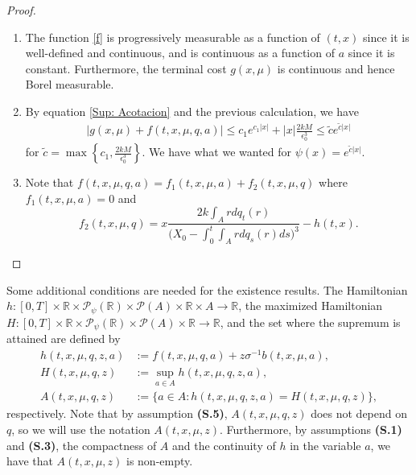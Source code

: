 \documentclass[11pt]{article}
\theoremstyle{definition}
\begin{document}
\begin{proof}
    \begin{enumerate}
        \item[\textbf{\hyperref[sup: S.3]{(S.3)}}]
        The function \eqref{f} is progressively measurable as a function of \( (t,x) \) since it is well-defined and continuous, and is continuous as a function of \( a \) since it is constant. Furthermore, the terminal cost \( g(x, \mu) \) is continuous and hence Borel measurable.
        \item[\textbf{\hyperref[sup: S.4]{(S.4)}}] By equation \eqref{Sup: Acotacion} and the previous calculation, we have
        \begin{align*}
            |g(x, \mu) + f(t,x,\mu,q,a)| \leq c_1 e^{c_1 |x|} + |x| \frac{2k M}{\epsilon_0^3} \leq \tilde{c} e^{\tilde{c} |x|}
        \end{align*}
        for \( \tilde{c} = \max \left\{ c_1, \frac{2k M}{\epsilon_0^3} \right\} \). We have what we wanted for \( \psi(x) = e^{\tilde{c} |x|} \).
        \item[\textbf{\hyperref[sup: S.5]{(S.5)}}]
        Note that \( f(t,x,\mu,q,a) = f_1(t,x,\mu,a) + f_2(t,x,\mu,q) \)
        where \( f_1(t,x,\mu,a) = 0 \) and 
        $$f_2(t,x,\mu,q) = x \frac{\displaystyle 2k \int_A r dq_t(r)}{\displaystyle \Big(X_0 - \int_0^t \int_A rdq_s(r) ds\Big)^3} - h(t,x).$$
    \end{enumerate}
\end{proof}

Some additional conditions are needed for the existence results. The Hamiltonian \( h : [0,T] \times \mathbb{R} \times \mathcal{P}_{\psi}(\mathbb{R}) \times \mathcal{P}(A) \times \mathbb{R}\times A \to \mathbb{R} \), the maximized Hamiltonian \( H : [0,T] \times \mathbb{R} \times \mathcal{P}_{\psi}(\mathbb{R}) \times \mathcal{P}(A) \times \mathbb{R} \to \mathbb{R} \), and the set where the supremum is attained are defined by
\begin{align*}
    h(t,x,\mu,q,z,a) &:= f(t,x,\mu,q,a) + z \sigma^{-1}b(t,x,\mu,a), \\
    H(t,x,\mu,q,z) &:= \sup_{a \in A} h(t,x,\mu,q,z,a), \\
    A(t,x,\mu,q,z) &:= \{ a \in A : h(t,x,\mu,q,z,a) = H(t,x,\mu,q,z) \},
\end{align*}
respectively. Note that by assumption \textbf{(S.5)}, \( A(t,x,\mu,q,z) \) does not depend on \( q \), so we will use the notation \( A(t,x,\mu,z) \). Furthermore, by assumptions \textbf{(S.1)} and \textbf{(S.3)}, the compactness of \( A \) and the continuity of \( h \) in the variable \( a \), we have that \( A(t,x,\mu,z) \) is non-empty.
\end{document}
